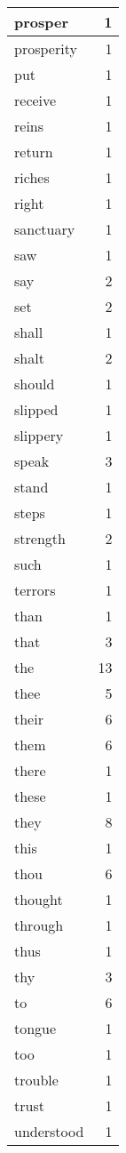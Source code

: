 \begin{center}
\begin{longtable}{l|r}
prosper & 1 \\ \hline
prosperity & 1 \\ \hline
put & 1 \\ \hline
receive & 1 \\ \hline
reins & 1 \\ \hline
return & 1 \\ \hline
riches & 1 \\ \hline
right & 1 \\ \hline
sanctuary & 1 \\ \hline
saw & 1 \\ \hline
say & 2 \\ \hline
set & 2 \\ \hline
shall & 1 \\ \hline
shalt & 2 \\ \hline
should & 1 \\ \hline
slipped & 1 \\ \hline
slippery & 1 \\ \hline
speak & 3 \\ \hline
stand & 1 \\ \hline
steps & 1 \\ \hline
strength & 2 \\ \hline
such & 1 \\ \hline
terrors & 1 \\ \hline
than & 1 \\ \hline
that & 3 \\ \hline
the & 13 \\ \hline
thee & 5 \\ \hline
their & 6 \\ \hline
them & 6 \\ \hline
there & 1 \\ \hline
these & 1 \\ \hline
they & 8 \\ \hline
this & 1 \\ \hline
thou & 6 \\ \hline
thought & 1 \\ \hline
through & 1 \\ \hline
thus & 1 \\ \hline
thy & 3 \\ \hline
to & 6 \\ \hline
tongue & 1 \\ \hline
too & 1 \\ \hline
trouble & 1 \\ \hline
trust & 1 \\ \hline
understood & 1 \\ \hline

\end{longtable}
\end{center}

